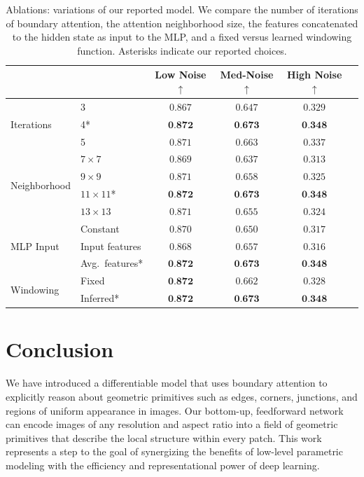 \documentclass[main.tex]{subfiles}
\begin{document}
\begin{table}[t]
\scriptsize
\centering
\setlength{\tabcolsep}{6pt}
{
\centering
\begin{tabular}{l | l | c c c l}
\multicolumn{1}{l}{} & & \! Low Noise$\uparrow$   & \! Med-Noise$\uparrow$   & \! High Noise$\uparrow$   \\ \hline
\multirow{3}{*}{Iterations}
 &3 & $0.867$  & $0.647$  & $0.329$ \\
 &4* & $\textbf{0.872}$  & $\textbf{0.673}$  & {$\textbf{0.348}$} \\
 &5 & $0.871$  & $0.663$  & $0.337$ \\\hline 
\multirow{4}{*}{Neighborhood} 
 &$7\times 7$ & $0.869$   & $0.637$  & $0.313$  \\
 &$9\times 9$ & $0.871$   & $0.658$  & $0.325$  \\
 &$11 \times 11$* & $\textbf{0.872}$  & $\textbf{0.673}$  & $\textbf{0.348}$ \\
 &$13\times 13$ & $0.871$   & $0.655$  & $0.324$  \\ \hline
\multirow{3}{*}{MLP Input} & Constant & $0.870$   & $0.650$  & $0.317$  \\
 &Input features & $0.868$   & $0.657$  & $0.316$  \\
 &Avg.~features* & $\textbf{0.872}$  & $\textbf{0.673}$  & $\textbf{0.348}$ \\ \hline
\multirow{2}{*}{Windowing}
&Fixed & $\textbf{0.872}$  & $0.662$  & $0.328$ \\
 &Inferred* & $\textbf{0.872}$  & $\textbf{0.673}$  &$\textbf{0.348}$ \\
\end{tabular}
}
\caption{\label{table:ablation2} Ablations: variations of our reported model. We compare the number of iterations of boundary attention, the attention neighborhood size, the features concatenated to the hidden state as input to the MLP, and a fixed versus learned windowing function. Asterisks indicate our reported choices.}
\end{table}

\section{Conclusion}
We have introduced a differentiable model that uses boundary attention to explicitly reason about geometric primitives such as edges, corners, junctions, and regions of uniform appearance in images.
Our bottom-up, feedforward network can encode images of any resolution and aspect ratio into a field of geometric primitives that describe the local structure within every patch. This work represents a step to the goal of synergizing the benefits of low-level parametric modeling with the efficiency and representational power of deep learning.

\ifSubfilesClassLoaded{


}{}
\end{document}
